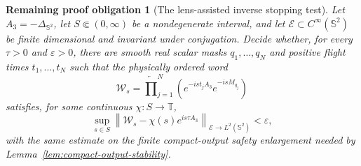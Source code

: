 \documentclass[11pt]{article}
\newtheorem{problem}[theorem]{Remaining proof obligation}
\theoremstyle{remark}
\newcommand{\T}{\mathbb T}
\begin{document}
\begin{problem}[The lens-assisted inverse stopping test]
\label{prob:lens-assisted-inverse}
Let $A_3=-\Delta_{\mathbb S^2}$, let
$S\Subset(0,\infty)$ be a nondegenerate interval, and let
$\mathcal E\subset C^\infty(\mathbb S^2)$ be finite dimensional and invariant
under conjugation.  Decide whether, for every $\tau>0$ and $\varepsilon>0$,
there are smooth real scalar masks $q_1,\ldots,q_N$ and positive flight times
$t_1,\ldots,t_N$ such that the physically ordered word
\begin{equation}
 \mathcal W_s=
 \overleftarrow{\prod}_{j=1}^{N}
 \left(e^{-is t_jA_3}e^{-isM_{q_j}}\right)
 \label{eq:lens-assisted-word}
\end{equation}
satisfies, for some continuous $\chi:S\to\T$,
\begin{equation}
 \sup_{s\in S}
 \left\|
  \mathcal W_s-\chi(s)e^{is\tau A_3}
 \right\|_{\mathcal E\to L^2(\mathbb S^2)}
 <\varepsilon,
 \label{eq:lens-assisted-inverse-target}
\end{equation}
with the same estimate on the finite compact-output safety enlargement needed
by Lemma~\ref{lem:compact-output-stability}.


\end{problem}
\end{document}
